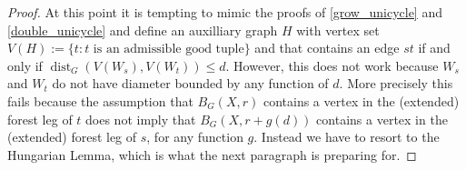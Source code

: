 \documentclass{patmorin}
\DeclareMathOperator{\dist}{dist}
\DeclareMathOperator{\thick}{th}
\begin{document}
\begin{proof}
At this point it is tempting to mimic the proofs of \cref{grow_unicycle} and \cref{double_unicycle} and define an auxilliary graph $H$ with vertex set $V(H):=\{t:\textrm{$t$ is an admissible good tuple}\}$ and that contains an edge $st$ if and only if $\dist_G(V(W_s),V(W_t))\le d$. However, this does not work because $W_s$ and $W_t$ do not have diameter bounded by any function of $d$.  More precisely this fails because the assumption that $B_G(X,r)$ contains a vertex in the (extended) forest leg of $t$ does not imply that $B_G(X,r+g(d))$ contains a vertex in the (extended) forest leg of $s$, for any function $g$.  Instead we have to resort to the Hungarian Lemma, which is what the next paragraph is preparing for.










\end{proof}
\end{document}

